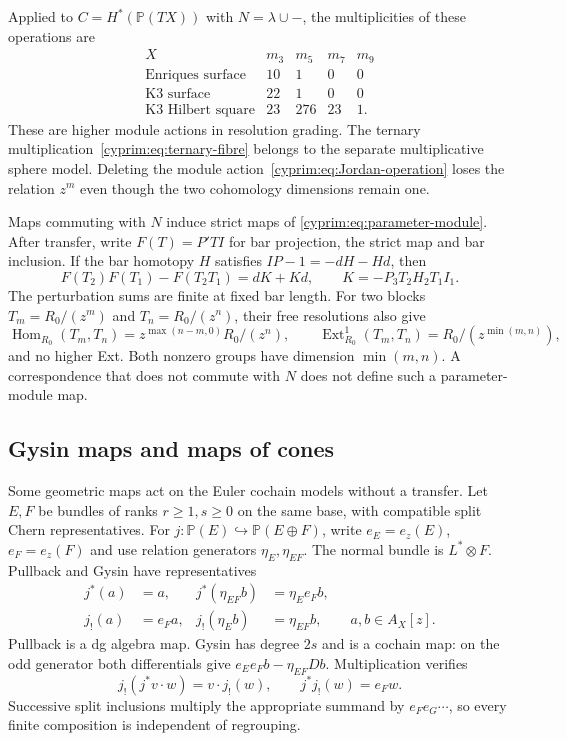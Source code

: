 Applied to $C=H^*(\mathbb P(TX))$ with $N=\lambda\cup-$,
the multiplicities of these operations are
\[
\begin{array}{c|rrrr}
 X&m_3&m_5&m_7&m_9\\\hline
 \text{Enriques surface}&10&1&0&0\\
 \text{K3 surface}&22&1&0&0\\
 \text{K3 Hilbert square}&23&276&23&1.
\end{array}
\]
These are higher module actions in resolution grading.
The ternary multiplication~\eqref{cyprim:eq:ternary-fibre}
belongs to the separate multiplicative sphere model.
Deleting the module action~\eqref{cyprim:eq:Jordan-operation}
loses the relation $z^m$ even though the two cohomology
dimensions remain one.

Maps commuting with $N$ induce strict maps of
\eqref{cyprim:eq:parameter-module}. After transfer,
write $F(T)=P'TI$ for bar projection, the strict map
and bar inclusion. If the bar homotopy $H$ satisfies
$IP-1=-dH-Hd$, then
\[
 F(T_2)F(T_1)-F(T_2T_1)=dK+Kd,
 \qquad K=-P_3T_2H_2T_1I_1.
\]
The perturbation sums are finite at fixed bar length.
For two blocks $T_m=R_0/(z^m)$ and $T_n=R_0/(z^n)$,
their free resolutions also give
\[
 \operatorname{Hom}_{R_0}(T_m,T_n)
   =z^{\max(n-m,0)}R_0/(z^n),
 \qquad
 \operatorname{Ext}^1_{R_0}(T_m,T_n)=R_0/(z^{\min(m,n)}),
\]
and no higher Ext. Both nonzero groups have dimension
$\min(m,n)$. A correspondence that does not commute
with $N$ does not define such a parameter-module map.

\subsection{Gysin maps and maps of cones}

Some geometric maps act on the Euler cochain models
without a transfer. Let $E,F$ be bundles of ranks
$r\ge1,s\ge0$ on the same base, with compatible split
Chern representatives. For
$j:\mathbb P(E)\hookrightarrow\mathbb P(E\oplus F)$,
write $e_E=e_z(E)$, $e_F=e_z(F)$ and use relation
generators $\eta_E,\eta_{EF}$. The normal bundle is
$L^*\otimes F$. Pullback and Gysin have representatives
\begin{equation}\label{cyprim:eq:split-Gysin}
\begin{aligned}
 j^*(a)&=a,&j^*(\eta_{EF}b)&=\eta_Ee_Fb,\\
 j_!(a)&=e_Fa,&j_!(\eta_Eb)&=\eta_{EF}b,
 \qquad a,b\in A_X[z].
\end{aligned}
\end{equation}
Pullback is a dg algebra map. Gysin has degree $2s$
and is a cochain map: on the odd generator both
differentials give $e_Ee_Fb-\eta_{EF}Db$.
Multiplication verifies
\[
 j_!(j^*v\cdot w)=v\cdot j_!(w),\qquad
 j^*j_!(w)=e_Fw.
\]
Successive split inclusions multiply the appropriate
summand by $e_Fe_G\cdots$, so every finite composition
is independent of regrouping.

